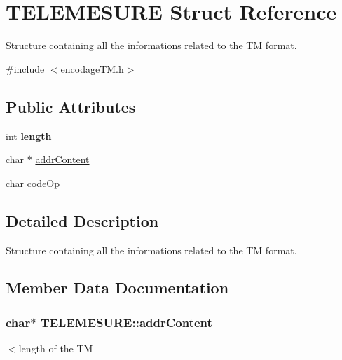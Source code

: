 \hypertarget{structTELEMESURE}{}\section{T\+E\+L\+E\+M\+E\+S\+U\+RE Struct Reference}
\label{structTELEMESURE}


Structure containing all the informations related to the TM format.  




{\ttfamily \#include $<$encodage\+T\+M.\+h$>$}

\subsection*{Public Attributes}
\begin{DoxyCompactItemize}
\item 
int {\bfseries length}\hypertarget{structTELEMESURE_ae32c0643cc783d4b91f58c3eae9c2972}{}\label{structTELEMESURE_ae32c0643cc783d4b91f58c3eae9c2972}

\item 
char $\ast$ \hyperlink{structTELEMESURE_ad718219979838b7e5c90e51321211303}{addr\+Content}
\item 
char \hyperlink{structTELEMESURE_a3aea5127821a1b646d11552886bee0c6}{code\+Op}
\end{DoxyCompactItemize}


\subsection{Detailed Description}
Structure containing all the informations related to the TM format. 

\subsection{Member Data Documentation}
\subsubsection[{\texorpdfstring{addr\+Content}{addrContent}}]{\setlength{\rightskip}{0pt plus 5cm}char$\ast$ T\+E\+L\+E\+M\+E\+S\+U\+R\+E\+::addr\+Content}\hypertarget{structTELEMESURE_ad718219979838b7e5c90e51321211303}{}\label{structTELEMESURE_ad718219979838b7e5c90e51321211303}
$<$length of the TM 
